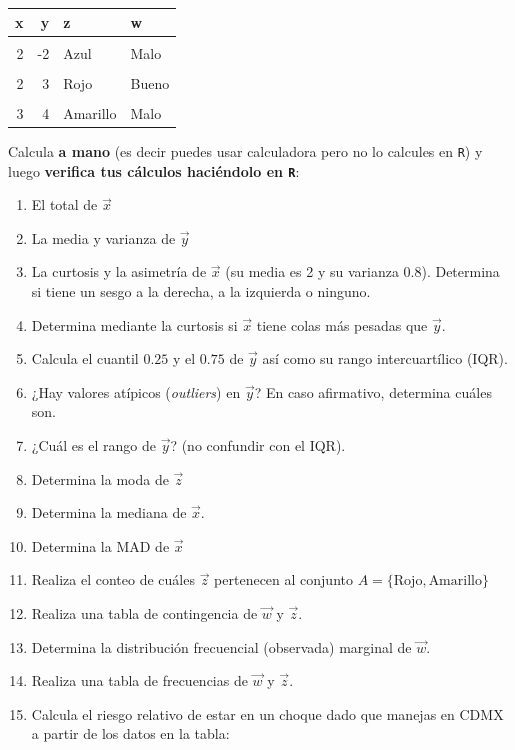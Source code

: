 \documentclass[
]{book}
\begin{document}
\begin{table}
\centering
\begin{tabular}{r|r|l|l}
\hline
x & y & z & w\\
\hline
\cellcolor{gray!6}{1} & \cellcolor{gray!6}{-100} & \cellcolor{gray!6}{Rojo} & \cellcolor{gray!6}{Bueno}\\
\hline
2 & -2 & Azul & Malo\\
\hline
\cellcolor{gray!6}{3} & \cellcolor{gray!6}{2} & \cellcolor{gray!6}{Azul} & \cellcolor{gray!6}{Regular}\\
\hline
2 & 3 & Rojo & Bueno\\
\hline
\cellcolor{gray!6}{1} & \cellcolor{gray!6}{1} & \cellcolor{gray!6}{Verde} & \cellcolor{gray!6}{Bueno}\\
\hline
3 & 4 & Amarillo & Malo\\
\hline
\end{tabular}
\end{table}

Calcula \textbf{a mano} (es decir puedes usar calculadora pero no lo calcules en \texttt{R}) y luego \textbf{verifica tus cálculos haciéndolo en \texttt{R}}:

\begin{enumerate}
\def\labelenumi{\arabic{enumi}.}
\item
  El total de \(\vec{x}\)
\item
  La media y varianza de \(\vec{y}\)
\item
  La curtosis y la asimetría de \(\vec{x}\) (su media es 2 y su varianza 0.8). Determina si tiene un sesgo a la derecha, a la izquierda o ninguno.
\item
  Determina mediante la curtosis si \(\vec{x}\) tiene colas más pesadas que \(\vec{y}\).
\item
  Calcula el cuantil \(0.25\) y el \(0.75\) de \(\vec{y}\) así como su rango intercuartílico (IQR).
\item
  ¿Hay valores atípicos (\emph{outliers}) en \(\vec{y}\)? En caso afirmativo, determina cuáles son.
\item
  ¿Cuál es el rango de \(\vec{y}\)? (no confundir con el IQR).
\item
  Determina la moda de \(\vec{z}\)
\item
  Determina la mediana de \(\vec{x}\).
\item
  Determina la MAD de \(\vec{x}\)
\item
  Realiza el conteo de cuáles \(\vec{z}\) pertenecen al conjunto \(A = \{ \text{Rojo}, \text{Amarillo} \}\)
\item
  Realiza una tabla de contingencia de \(\vec{w}\) y \(\vec{z}\).
\item
  Determina la distribución frecuencial (observada) marginal de \(\vec{w}\).
\item
  Realiza una tabla de frecuencias de \(\vec{w}\) y \(\vec{z}\).
\item
  Calcula el riesgo relativo de estar en un choque dado que manejas en CDMX a partir de los datos en la tabla:
\end{enumerate}
\end{document}
